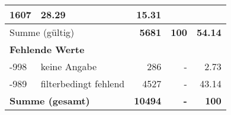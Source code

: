 \begin{longtable}{lXrrr}
       \num{1607} &
       \num[round-mode=places,round-precision=2]{28.29} &
         \num[round-mode=places,round-precision=2]{15.31} \\
     \midrule
     \multicolumn{2}{l}{Summe (gültig)} &
       \textbf{\num{5681}} &
     \textbf{\num{100}} &
       \textbf{\num[round-mode=places,round-precision=2]{54.14}} \\
     \multicolumn{5}{l}{\textbf{Fehlende Werte}}\\
       -998 &
       keine Angabe &
         \num{286} &
        - &
         \num[round-mode=places,round-precision=2]{2.73} \\
       -989 &
       filterbedingt fehlend &
         \num{4527} &
        - &
         \num[round-mode=places,round-precision=2]{43.14} \\
     \midrule
     \multicolumn{2}{l}{\textbf{Summe (gesamt)}} &
          \textbf{\num{10494}} &
        \textbf{-} &
        \textbf{\num{100}} \\
     \bottomrule
     \end{longtable}
     
